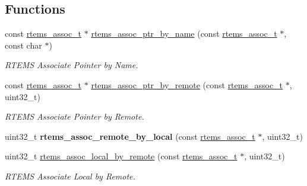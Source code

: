 \subsection*{Functions}
\begin{DoxyCompactItemize}
\item 
\mbox{\label{group__RTEMSAPIAssociativity_gab8be19d3b2731a9f3f6bde322ad40904}} 
const \mbox{\hyperlink{structrtems__assoc__t}{rtems\+\_\+assoc\+\_\+t}} $\ast$ \mbox{\hyperlink{group__RTEMSAPIAssociativity_gab8be19d3b2731a9f3f6bde322ad40904}{rtems\+\_\+assoc\+\_\+ptr\+\_\+by\+\_\+name}} (const \mbox{\hyperlink{structrtems__assoc__t}{rtems\+\_\+assoc\+\_\+t}} $\ast$, const char $\ast$)
\begin{DoxyCompactList}\small\item\em R\+T\+E\+MS Associate Pointer by Name. \end{DoxyCompactList}\item 
\mbox{\label{group__RTEMSAPIAssociativity_gace083256448a2a428ede7396f2e8fb67}} 
const \mbox{\hyperlink{structrtems__assoc__t}{rtems\+\_\+assoc\+\_\+t}} $\ast$ \mbox{\hyperlink{group__RTEMSAPIAssociativity_gace083256448a2a428ede7396f2e8fb67}{rtems\+\_\+assoc\+\_\+ptr\+\_\+by\+\_\+remote}} (const \mbox{\hyperlink{structrtems__assoc__t}{rtems\+\_\+assoc\+\_\+t}} $\ast$, uint32\+\_\+t)
\begin{DoxyCompactList}\small\item\em R\+T\+E\+MS Associate Pointer by Remote. \end{DoxyCompactList}\item 
\mbox{\label{group__RTEMSAPIAssociativity_ga6ffe22a2b5a00c33ee1f835bb4dca259}} 
uint32\+\_\+t {\bfseries rtems\+\_\+assoc\+\_\+remote\+\_\+by\+\_\+local} (const \mbox{\hyperlink{structrtems__assoc__t}{rtems\+\_\+assoc\+\_\+t}} $\ast$, uint32\+\_\+t)
\item 
\mbox{\label{group__RTEMSAPIAssociativity_ga3aad4fe900c6a8d2cf4c08e4ec1521d4}} 
uint32\+\_\+t \mbox{\hyperlink{group__RTEMSAPIAssociativity_ga3aad4fe900c6a8d2cf4c08e4ec1521d4}{rtems\+\_\+assoc\+\_\+local\+\_\+by\+\_\+remote}} (const \mbox{\hyperlink{structrtems__assoc__t}{rtems\+\_\+assoc\+\_\+t}} $\ast$, uint32\+\_\+t)
\begin{DoxyCompactList}\small\item\em R\+T\+E\+MS Associate Local by Remote. \end{DoxyCompactList}\item 

\end{DoxyCompactItemize}
